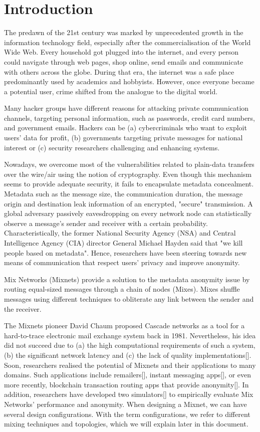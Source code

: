 \documentclass[logo,msc,cyber]{infthesis}   %
\begin{document}
\chapter{Introduction}

The predawn of the 21st century was marked by unprecedented growth in the
information technology field, especially after the commercialisation of the
World Wide Web. Every household got plugged into the internet, and every person
could navigate through web pages, shop online, send emails and communicate with
others across the globe. During that era, the internet was a safe place
predominantly used by academics and hobbyists. However, once everyone became a
potential user, crime shifted from the analogue to the digital world.

Many hacker groups have different reasons for attacking private communication
channels, targeting personal information, such as passwords, credit card
numbers, and government emails. Hackers can be (a) cybercriminals who want to
exploit users' data for profit, (b) governments targeting private messages for
national interest or (c) security researchers challenging and enhancing systems.


Nowadays, we overcome most of the vulnerabilities related to plain-data
transfers over the wire/air using the notion of cryptography. Even though this
mechanism seems to provide adequate security, it fails to encapsulate metadata
concealment. Metadata such as the message size, the communication duration, the
message origin and destination leak information of an encrypted, "secure"
transmission. A global adversary passively eavesdropping on every network node
can statistically observe a message's sender and receiver with a certain
probability. Characteristically, the former National Security Agency (NSA) and
Central Intelligence Agency (CIA) director General Michael Hayden said that "we
kill people based on metadata". Hence, researchers have been steering towards
new means of communication that respect users' privacy and improve anonymity.

Mix Networks (Mixnets) provide a solution to the metadata anonymity issue by
routing equal-sized messages through a chain of nodes (Mixes). Mixes shuffle
messages using different techniques to obliterate any link between the sender
and the receiver. 

The Mixnets pioneer David Chaum proposed Cascade networks as a tool for a
hard-to-trace electronic mail exchange system back in 1981. Nevertheless, his
idea did not succeed due to (a) the high computational requirements of such a
system, (b) the significant network latency and (c) the lack of quality
implementations[]. Soon, researchers realised the potential of Mixnets and their
applications to many domains. Such applications include remailers[], instant
messaging apps[], or even more recently, blockchain transaction routing apps
that provide anonymity[]. In addition, researchers have developed two
simulators[] to empirically evaluate Mix Networks' performance and anonymity.
When designing a Mixnet, we can have several design configurations. With the
term configurations, we refer to different mixing techniques and topologies,
which we will explain later in this document.
\end{document}
